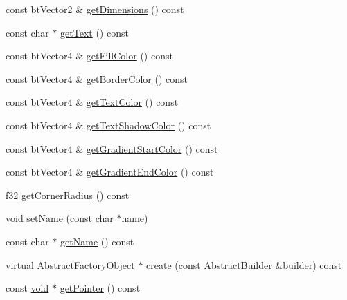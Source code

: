 \begin{DoxyCompactItemize}
\item 
const bt\+Vector2 \& \mbox{\hyperlink{classnjli_1_1_button_h_u_d_a5b0987df2a6b670226c12dc364d6e3a3}{get\+Dimensions}} () const
\item 
const char $\ast$ \mbox{\hyperlink{classnjli_1_1_button_h_u_d_a0861390deacc178bb5d8d3f5795f2257}{get\+Text}} () const
\item 
const bt\+Vector4 \& \mbox{\hyperlink{classnjli_1_1_button_h_u_d_a2b5873b247fac1bd17ff2729a372f4b7}{get\+Fill\+Color}} () const
\item 
const bt\+Vector4 \& \mbox{\hyperlink{classnjli_1_1_button_h_u_d_a1c85e36e3bee7d12f8af5b2b25cf660a}{get\+Border\+Color}} () const
\item 
const bt\+Vector4 \& \mbox{\hyperlink{classnjli_1_1_button_h_u_d_a0216f72b83c5d25ed269d5d18b58f4ac}{get\+Text\+Color}} () const
\item 
const bt\+Vector4 \& \mbox{\hyperlink{classnjli_1_1_button_h_u_d_a990306059d39800f64dc3d02a12f2dda}{get\+Text\+Shadow\+Color}} () const
\item 
const bt\+Vector4 \& \mbox{\hyperlink{classnjli_1_1_button_h_u_d_a7e8db31df5123c9d9a70f83aa4d1edb0}{get\+Gradient\+Start\+Color}} () const
\item 
const bt\+Vector4 \& \mbox{\hyperlink{classnjli_1_1_button_h_u_d_a8527937688cb50f4c57af65e51df2d6a}{get\+Gradient\+End\+Color}} () const
\item 
\mbox{\hyperlink{_util_8h_a5f6906312a689f27d70e9d086649d3fd}{f32}} \mbox{\hyperlink{classnjli_1_1_button_h_u_d_a378f76c76951ad2d48df16ef43971ed2}{get\+Corner\+Radius}} () const
\item 
\mbox{\hyperlink{_thread_8h_af1e856da2e658414cb2456cb6f7ebc66}{void}} \mbox{\hyperlink{classnjli_1_1_button_h_u_d_a087eb5f8d9f51cc476f12f1d10a3cb95}{set\+Name}} (const char $\ast$name)
\item 
const char $\ast$ \mbox{\hyperlink{classnjli_1_1_button_h_u_d_ad41266885be835f3ee602311e20877a4}{get\+Name}} () const
\item 
virtual \mbox{\hyperlink{classnjli_1_1_abstract_factory_object}{Abstract\+Factory\+Object}} $\ast$ \mbox{\hyperlink{classnjli_1_1_button_h_u_d_a83a8876ae63b92804004cf3febe76573}{create}} (const \mbox{\hyperlink{classnjli_1_1_abstract_builder}{Abstract\+Builder}} \&builder) const
\item 
const \mbox{\hyperlink{_thread_8h_af1e856da2e658414cb2456cb6f7ebc66}{void}} $\ast$ \mbox{\hyperlink{classnjli_1_1_button_h_u_d_ac4ca71716ed832be357f15f8262c8448}{get\+Pointer}} () const

\end{DoxyCompactItemize}
